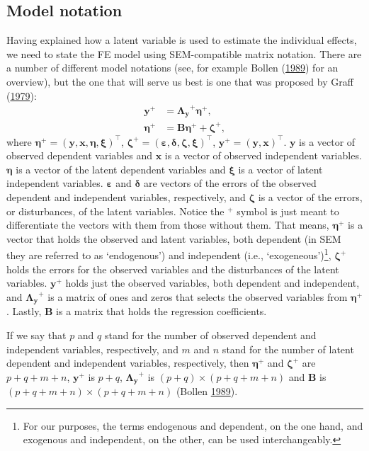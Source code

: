 \documentclass[
  12pt,
  a4paper]{article}
\begin{document}
\hypertarget{model-notation}{%
\subsection{Model notation}\label{model-notation}}

Having explained how a latent variable is used to estimate the
individual effects, we need to state the FE model using SEM-compatible
matrix notation. There are a number of different model notations (see,
for example Bollen (\protect\hyperlink{ref-Bollen1989}{1989}) for an
overview), but the one that will serve us best is one that was proposed
by Graff (\protect\hyperlink{ref-Graff1979}{1979}): \begin{align}
\bm{y}^{+} & = \bm{\Lambda_{y}}^{+} \bm{\eta}^{+}, \\
\bm{\eta}^{+} & = \bm{B}\bm{\eta}^{+} + \bm{\zeta}^{+}, 
\end{align} where
\(\bm{\eta}^{+} = (\bm{y}, \bm{x}, \bm{\eta}, \bm{\xi})^{\intercal}\),
\(\bm{\zeta}^{+} = (\bm{\varepsilon}, \bm{\delta}, \bm{\zeta}, \bm{\xi})^{\intercal}\),
\(\bm{y}^{+} = (\bm{y}, \bm{x})^{\intercal}\). \(\bm{y}\) is a vector of
observed dependent variables and \(\bm{x}\) is a vector of observed
independent variables. \(\bm{\eta}\) is a vector of the latent dependent
variables and \(\bm{\xi}\) is a vector of latent independent variables.
\(\bm{\varepsilon}\) and \(\bm{\delta}\) are vectors of the errors of
the observed dependent and independent variables, respectively, and
\(\bm{\zeta}\) is a vector of the errors, or disturbances, of the latent
variables. Notice the \(^{+}\) symbol is just meant to differentiate the
vectors with them from those without them. That means, \(\bm{\eta}^{+}\)
is a vector that holds the observed and latent variables, both dependent
(in SEM they are referred to as `endogenous') and independent (i.e.,
`exogeneous')\footnote{For our purposes, the terms endogenous and
  dependent, on the one hand, and exogenous and independent, on the
  other, can be used interchangeably.}, \(\bm{\zeta}^{+}\) holds the
errors for the observed variables and the disturbances of the latent
variables. \(\bm{y}^{+}\) holds just the observed variables, both
dependent and independent, and \(\bm{\Lambda_{y}}^{+}\) is a matrix of
ones and zeros that selects the observed variables from
\(\bm{\eta}^{+}\). Lastly, \(\bm{B}\) is a matrix that holds the
regression coefficients.

If we say that \(p\) and \(q\) stand for the number of observed
dependent and independent variables, respectively, and \(m\) and \(n\)
stand for the number of latent dependent and independent variables,
respectively, then \(\bm{\eta}^{+}\) and \(\bm{\zeta}^{+}\) are
\(p + q + m + n\), \(\bm{y}^{+}\) is \(p + q\), \(\bm{\Lambda_{y}}^{+}\)
is \((p + q) \times (p + q + m + n)\) and \(\bm{B}\) is
\((p + q + m + n) \times (p + q + m + n)\) (Bollen
\protect\hyperlink{ref-Bollen1989}{1989}).
\end{document}
